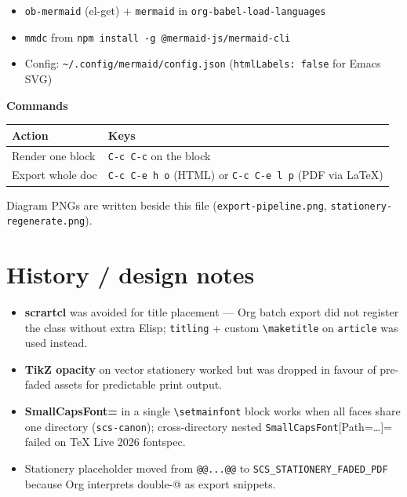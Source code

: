 \documentclass[11pt]{article}
\begin{document}
\begin{itemize}
\item \texttt{ob-mermaid} (el-get) + \texttt{mermaid} in \texttt{org-babel-load-languages}
\item \texttt{mmdc} from \texttt{npm install -g @mermaid-js/mermaid-cli}
\item Config: \texttt{\textasciitilde{}/.config/mermaid/config.json} (\texttt{htmlLabels: false} for Emacs SVG)
\end{itemize}

\textbf{\textbf{Commands}}

\begin{center}
\begin{tabular}{ll}
Action & Keys\\
\hline
Render one block & \texttt{C-c C-c} on the block\\
Export whole doc & \texttt{C-c C-e h o} (HTML) or \texttt{C-c C-e l p} (PDF via \LaTeX{})\\
\end{tabular}
\end{center}

Diagram PNGs are written beside this file (\texttt{export-pipeline.png},
\texttt{stationery-regenerate.png}).
\section*{History / design notes}
\label{sec:org3a32855}

\begin{itemize}
\item \textbf{scrartcl} was avoided for title placement — Org batch export did not register
the class without extra Elisp; \texttt{titling} + custom \texttt{\textbackslash{}maketitle} on \texttt{article}
was used instead.
\item \textbf{TikZ opacity} on vector stationery worked but was dropped in favour of
pre-faded assets for predictable print output.
\item \textbf{SmallCapsFont=} in a single \texttt{\textbackslash{}setmainfont} block works when all faces share
one directory (\texttt{scs-canon}); cross-directory nested \texttt{SmallCapsFont}{[}Path=\ldots{}]=
failed on \TeX{} Live 2026 fontspec.
\item Stationery placeholder moved from \texttt{@@...@@} to \texttt{SCS\_STATIONERY\_FADED\_PDF}
because Org interprets double-@ as export snippets.
\end{itemize}
\end{document}
